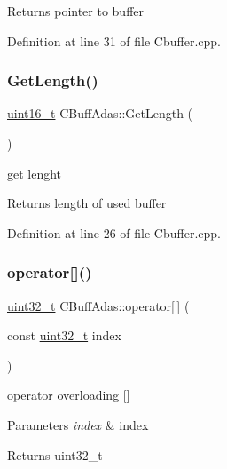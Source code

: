 \begin{DoxyReturn}{Returns}
pointer to buffer 
\end{DoxyReturn}


Definition at line 31 of file Cbuffer.\+cpp.

\mbox{\label{class_c_buff_adas_a493f61488df8ac9f7e942af1a2fbdbf3}} 
\subsubsection{\texorpdfstring{Get\+Length()}{GetLength()}}
{\footnotesize\ttfamily \mbox{\hyperlink{_a_d_a_s___types_8h_a1f1825b69244eb3ad2c7165ddc99c956}{uint16\+\_\+t}} C\+Buff\+Adas\+::\+Get\+Length (\begin{DoxyParamCaption}{ }\end{DoxyParamCaption})}



get lenght 

\begin{DoxyReturn}{Returns}
length of used buffer 
\end{DoxyReturn}


Definition at line 26 of file Cbuffer.\+cpp.

\mbox{\label{class_c_buff_adas_ae1a6aa5f049b0e1e04950af1c55df3d7}} 
\subsubsection{\texorpdfstring{operator[]()}{operator[]()}}
{\footnotesize\ttfamily \mbox{\hyperlink{_a_d_a_s___types_8h_a06896e8c53f721507066c079052171f8}{uint32\+\_\+t}} C\+Buff\+Adas\+::operator\mbox{[}$\,$\mbox{]} (\begin{DoxyParamCaption}\item[{const \mbox{\hyperlink{_a_d_a_s___types_8h_a06896e8c53f721507066c079052171f8}{uint32\+\_\+t}}}]{index }\end{DoxyParamCaption})}



operator overloading \mbox{[}\mbox{]} 


\begin{DoxyParams}{Parameters}
{\em index} & index \\
\hline
\end{DoxyParams}
\begin{DoxyReturn}{Returns}
uint32\+\_\+t 
\end{DoxyReturn}


